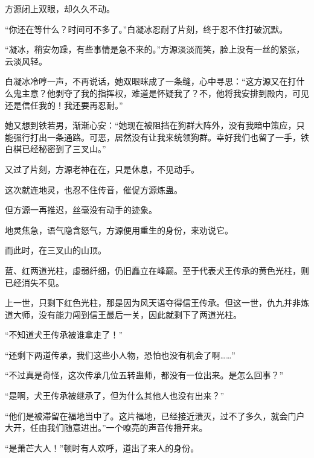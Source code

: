\begin{this_body}
方源闭上双眼，却久久不动。

“你还在等什么？时间可不多了。”白凝冰忍耐了片刻，终于忍不住打破沉默。

“凝冰，稍安勿躁，有些事情是急不来的。”方源淡淡而笑，脸上没有一丝的紧张，云淡风轻。

白凝冰冷哼一声，不再说话，她双眼眯成了一条缝，心中寻思：“这方源又在打什么鬼主意？他剥夺了我的指挥权，难道是怀疑我了？不，他将我安排到殿内，可见还是信任我的！我还要再忍耐。”

她又想到铁若男，渐渐心安：“她现在被阻挡在狗群大阵外，没有我暗中策应，只能强行打出一条通路。可恶，居然没有让我来统领狗群。幸好我们也留了一手，铁白棋已经秘密到了三叉山。”

又过了片刻，方源老神在在，只是休息，不见动手。

这次就连地灵，也忍不住传音，催促方源炼蛊。

但方源一再推迟，丝毫没有动手的迹象。

地灵焦急，语气隐含怒气，方源便用重生的身份，来劝说它。

而此时，在三叉山的山顶。

蓝、红两道光柱，虚弱纤细，仍旧矗立在峰巅。至于代表犬王传承的黄色光柱，则已经消失不见。

上一世，只剩下红色光柱，那是因为风天语夺得信王传承。但这一世，仇九并非炼道大师，没有能力闯到信王最后一关，因此就剩下了两道光柱。

“不知道犬王传承被谁拿走了！”

“还剩下两道传承，我们这些小人物，恐怕也没有机会了啊……”

“不过真是奇怪，这次传承几位五转蛊师，都没有一位出来。是怎么回事？”

“是啊，犬王传承被继承了，但为什么其他人也没有出来？”

“他们是被滞留在福地当中了。这片福地，已经接近溃灭，过不了多久，就会门户大开，任由我们随意进出。”一个嘹亮的声音传播开来。

“是萧芒大人！”顿时有人欢呼，道出了来人的身份。

\end{this_body}

